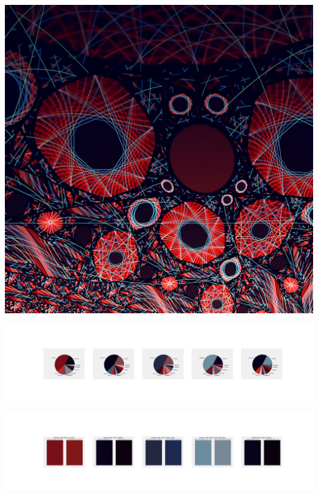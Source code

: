 \documentclass[11pt]{article}
\begin{document}
\begin{landscape}
    \begin{center}
    \includegraphics[width=\textwidth]{./nbimg/file (294).jpg}
    \end{center}

    \begin{center}
    \includegraphics[width=250mm]{./nbimg/pie-216.jpg}
    \end{center}

    \begin{center}
    \includegraphics[width=250mm]{./nbimg/peak-216.jpg}
    \end{center}
    


\end{landscape}
\end{document}
